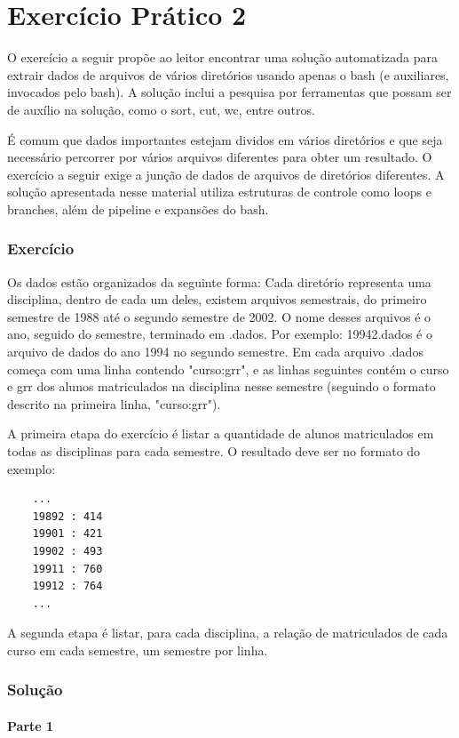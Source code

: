 \documentclass[oneside, 11 pt]{article}
\begin{document}
	\newpage
	\part{Exercício Prático 2}
	O exercício a seguir propõe ao leitor encontrar uma solução automatizada para extrair dados de arquivos de vários diretórios usando apenas o bash (e auxiliares, invocados pelo bash). A solução inclui a pesquisa por ferramentas que possam ser de auxílio na solução, como o sort, cut, wc, entre outros.
	
	É comum que dados importantes estejam dividos em vários diretórios e que seja necessário percorrer por vários arquivos diferentes para obter um resultado. O exercício a seguir exige a junção de dados de arquivos de diretórios diferentes. A solução apresentada nesse material utiliza estruturas de controle como loops e branches, além de pipeline e expansões do bash.
	
	\section{Exercício}
	Os dados estão organizados da seguinte forma: Cada diretório representa uma disciplina, dentro de cada um deles, existem arquivos semestrais, do primeiro semestre de 1988 até o segundo semestre de 2002. O nome desses arquivos é o ano, seguido do semestre, terminado em .dados. Por exemplo: 19942.dados é o arquivo de dados do ano 1994 no segundo semestre. Em cada arquivo .dados começa com uma linha contendo "curso:grr", e as linhas seguintes contém o curso e grr dos alunos matriculados na disciplina nesse semestre (seguindo o formato descrito na primeira linha, "curso:grr").
	
	A primeira etapa do exercício é listar a quantidade de alunos matriculados em todas as disciplinas para cada semestre. O resultado deve ser no formato do exemplo:
	
	\begin{lstlisting}
	...
	19892 : 414
	19901 : 421
	19902 : 493
	19911 : 760
	19912 : 764
	...
	\end{lstlisting}
	
	A segunda etapa é listar, para cada disciplina, a relação de matriculados de cada curso em cada semestre, um semestre por linha.
	
	\section{Solução}
	
	\subsection{Parte 1}
	
\end{document}
